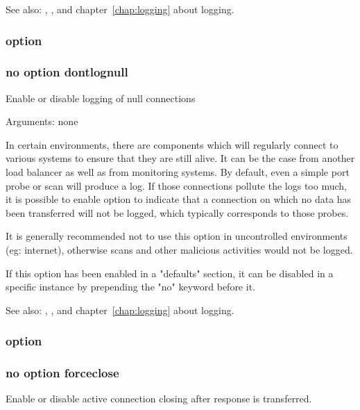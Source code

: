   See also: , ,  and chapter~\ref{chap:logging} about
             logging.

\subsubsection[dontlognull]{option }
\subsubsection*{no option dontlognull}


  Enable or disable logging of null connections


  Arguments: none

  In certain environments, there are components which will regularly connect to
  various systems to ensure that they are still alive. It can be the case from
  another load balancer as well as from monitoring systems. By default, even a
  simple port probe or scan will produce a log. If those connections pollute
  the logs too much, it is possible to enable option  to indicate
  that a connection on which no data has been transferred will not be logged,
  which typically corresponds to those probes.

  It is generally recommended not to use this option in uncontrolled
  environments (eg: internet), otherwise scans and other malicious activities
  would not be logged.

  If this option has been enabled in a "defaults" section, it can be disabled
  in a specific instance by prepending the "no" keyword before it.

  See also: , ,  and chapter~\ref{chap:logging} about logging.

\subsubsection[forceclose]{option }
\subsubsection*{no option forceclose}


  Enable or disable active connection closing after response is transferred.

